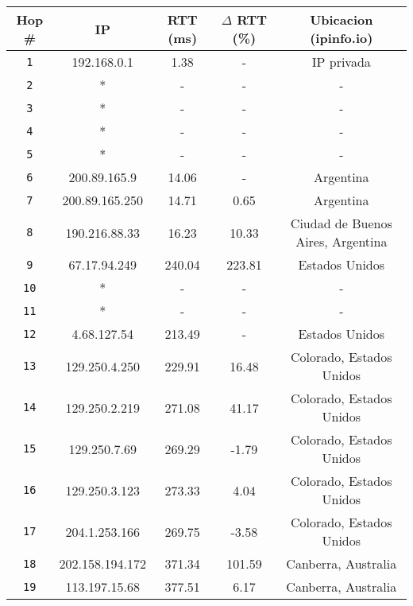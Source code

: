 \begin{table}[ht]\begin{center}
    \begin{tabular}{|c|c|c|c|c|}
    \hline
    \textbf{Hop \#} & \textbf{IP}& \textbf{RTT (ms)} & \textbf{$\Delta$ RTT (\%)} & \textbf{Ubicacion (ipinfo.io)} \\ \hline
    \texttt{1} & 192.168.0.1      & 1.38    & -       & IP privada  \\ \hline
    \texttt{2} & *                & -       & -       & -   \\ \hline
    \texttt{3} & *                & -       & -       & -   \\ \hline
    \texttt{4} & *                & -       & -       & -   \\ \hline
    \texttt{5} & *                & -       & -       & -   \\ \hline
    \texttt{6} & 200.89.165.9     & 14.06   & -       & Argentina    \\ \hline
    \texttt{7} & 200.89.165.250   & 14.71    & 0.65   & Argentina   \\ \hline
    \texttt{8} & 190.216.88.33    & 16.23    & 10.33  & Ciudad de Buenos Aires, Argentina   \\ \hline
    \texttt{9} & 67.17.94.249     & 240.04  & 223.81 & Estados Unidos   \\ \hline
    \texttt{10} & *               & -       & -       & -   \\ \hline
    \texttt{11} & *               & -       & -       & -    \\ \hline
    \texttt{12} & 4.68.127.54     & 213.49  & -       & Estados Unidos   \\ \hline
    \texttt{13} & 129.250.4.250   & 229.91  & 16.48    & Colorado, Estados Unidos   \\ \hline
    \texttt{14} & 129.250.2.219   & 271.08  & 41.17   & Colorado, Estados Unidos   \\ \hline
    \texttt{15} & 129.250.7.69    & 269.29  & -1.79   & Colorado, Estados Unidos   \\ \hline
    \texttt{16} & 129.250.3.123   & 273.33  & 4.04    & Colorado, Estados Unidos    \\ \hline
    \texttt{17} & 204.1.253.166   & 269.75  & -3.58   & Colorado, Estados Unidos   \\ \hline
    \texttt{18} & 202.158.194.172 & 371.34  & 101.59   & Canberra, Australia   \\ \hline
    \texttt{19} & 113.197.15.68   & 377.51  & 6.17    & Canberra, Australia   \\ \hline

\end{tabular}
\end{center}
\end{table}
